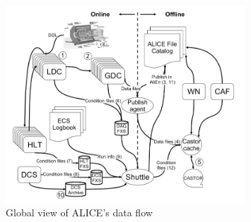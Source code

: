 \begin{figure}[t]
\centering
\includegraphics[width=0.8\textwidth]{Images/Chapter3/data_flow}
\caption[ALICE Data Flow]{Global view of ALICE’s data flow}
\label{Fig:cap3-1.10}
\end{figure}


